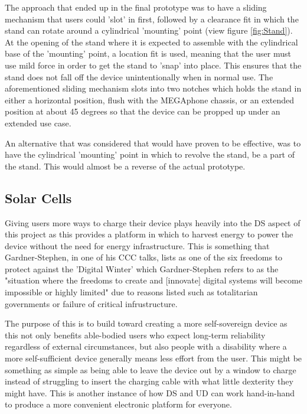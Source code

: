 The approach that ended up in the final prototype was to have a sliding mechanism that users could 'slot' in first, followed by a clearance fit in which the stand can rotate around a cylindrical 'mounting' point (view figure \ref{fig:Stand}).
At the opening of the stand where it is expected to assemble with the cylindrical base of the 'mounting' point, a location fit is used, meaning that the user must use mild force in order to get the stand to 'snap' into place.
This ensures that the stand does not fall off the device unintentionally when in normal use.
The aforementioned sliding mechanism slots into two notches which holds the stand in either a horizontal position, flush with the MEGAphone chassis, or an extended position at about 45 degrees so that the device can be propped up under an extended use case.

An alternative that was considered that would have proven to be effective, was to have the cylindrical 'mounting' point in which to revolve the stand, be a part of the stand.
This would almost be a reverse of the actual prototype.

\subsection{Solar Cells} \label{Solar Cells}

Giving users more ways to charge their device plays heavily into the DS aspect of this project as this provides a platform in which to harvest energy to power the device without the need for energy infrastructure.
This is something that Gardner-Stephen, in one of his CCC talks, lists as one of the six freedoms to protect against the 'Digital Winter' which Gardner-Stephen refers to as the "situation where the freedoms to create and [innovate] digital systems will become impossible or highly limited" due to reasons listed such as totalitarian governments or failure of critical infrustructure\cite{freedoms}.

The purpose of this is to build toward creating a more self-sovereign device as this not only benefits able-bodied users who expect long-term reliability regardless of external circumstances, but also people with a disability where a more self-sufficient device generally means less effort from the user.
This might be something as simple as being able to leave the device out by a window to charge instead of struggling to insert the charging cable with what little dexterity they might have.
This is another instance of how DS and UD can work hand-in-hand to produce a more convenient electronic platform for everyone.

